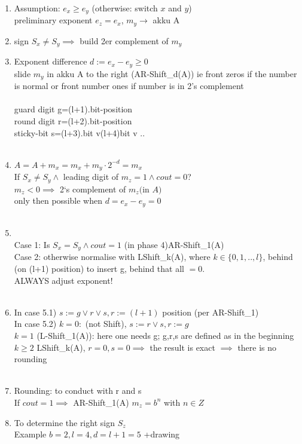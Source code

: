 \documentclass[a4paper, 11pt]{report}
\theoremstyle{break}
\theoremstyle{proofstyle}
\begin{document}
    \begin{enumerate}
        \item  Assumption: $e_x\geqslant e_y$ (otherwise: switch $x$ and $y$) \\
        preliminary exponent $e_z=e_x$, $m_y\to $ akku A
        \item sign $S_x\not = S_y \implies $ build 2er complement of $m_y$ 
        \item Exponent difference $d:=e_x-e_y\geqslant 0$ \\
        slide $m_y$ in akku A to the right (AR-Shift_d(A)) \to ie front zeros if the number is normal or front number ones if number is in 2's complement \\
        \\
        guard digit g=(l+1).bit-position \\
        round digit r=(l+2).bit-position \\
        sticky-bit s=(l+3).bit v(l+4)bit v .. \\
        \\
        \item $A=A+m_x=m_x+m_y\cdot 2^{-d}=m_x$ \\
        If $S_x\not = S_y \land $ leading digit of $m_z=1 \land cout=0$? \\
        \implies $m_z<0 \implies$ 2`s complement of $m_z($in $A)$ \\
        only then possible when $d=e_x-e_y=0$ \\
        \\
        \item \\
        Case 1: Is $S_x=S_y \land cout=1$ (in phase 4)\cdot AR-Shift_1(A) \\
        Case 2: otherwise normalise with LShift_k(A), where $k\in \{0,1,..,l\}$, behind (on (l+1) position) to insert g, behind that all $=0$. \\
        ALWAYS adjust exponent! \\
        \\
        \item In case 5.1) $s:=g \lor r\lor s, r:=(l+1)$ position (per AR-Shift_1)\\
        In case 5.2) $k=0: $ (not Shift), $s:=r\lor s, r:=g$ \\
        $k=1$ (L-Shift_1(A)): here one needs g; g,r,s are defined as in the beginning \\
        $k\geqslant 2$ LShift_k(A), $r=0, s=0 \implies $ the result is exact $\implies$ there is no rounding \\
        \\
        \item Rounding: to conduct with r and s\\
        If $cout=1\implies $ AR-Shift_1(A) \implies $m_z=b^n$ with $n\in Z$ \\
        
        \item To determine the right sign $S_z$ \\
        Example $b=2,l=4,d=l+1=5$ +drawing \\
    \end{enumerate} \bigskip
    
\end{document}
